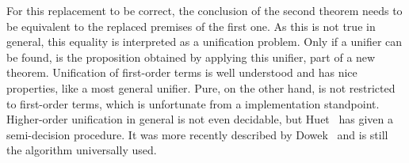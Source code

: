 For this replacement to be correct, the conclusion of the second theorem needs to be equivalent to the replaced premises of the first one. As this is not true in general, this equality is interpreted as a unification problem. Only if a unifier can be found, is the proposition obtained by applying this unifier, part of a new theorem. Unification of first-order terms is well understood and has nice properties, like a most general unifier. Pure, on the other hand, is not restricted to first-order terms, which is unfortunate from a implementation standpoint. Higher-order unification in general is not even decidable, but Huet~\parencite{Huet1975} has given a semi-decision procedure. It was more recently described by Dowek~\parencite{Dowek20011009} and is still the algorithm universally used.